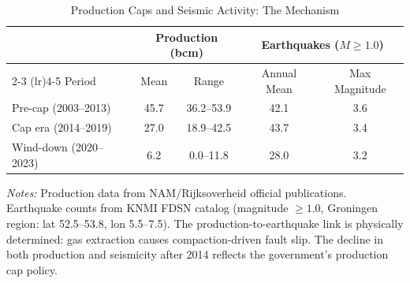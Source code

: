 \begin{table}[htbp]
\centering
\begin{threeparttable}
\caption{Production Caps and Seismic Activity: The Mechanism}
\label{tab:mechanism}
\begin{tabular}{lcccc}
\toprule
 & \multicolumn{2}{c}{Production (bcm)} & \multicolumn{2}{c}{Earthquakes ($M \geq 1.0$)} \\
\cmidrule(lr){2-3} \cmidrule(lr){4-5}
Period & Mean & Range & Annual Mean & Max Magnitude \\
\midrule
Pre-cap (2003--2013) & 45.7 & 36.2--53.9 & 42.1 & 3.6 \\
Cap era (2014--2019) & 27.0 & 18.9--42.5 & 43.7 & 3.4 \\
Wind-down (2020--2023) & 6.2 & 0.0--11.8 & 28.0 & 3.2 \\
\bottomrule
\end{tabular}
\begin{tablenotes}[flushleft]
\small
\item \textit{Notes:} Production data from NAM/Rijksoverheid official publications. Earthquake counts from KNMI FDSN catalog (magnitude $\geq 1.0$, Groningen region: lat 52.5--53.8, lon 5.5--7.5). The production-to-earthquake link is physically determined: gas extraction causes compaction-driven fault slip. The decline in both production and seismicity after 2014 reflects the government's production cap policy.
\end{tablenotes}
\end{threeparttable}
\end{table}
